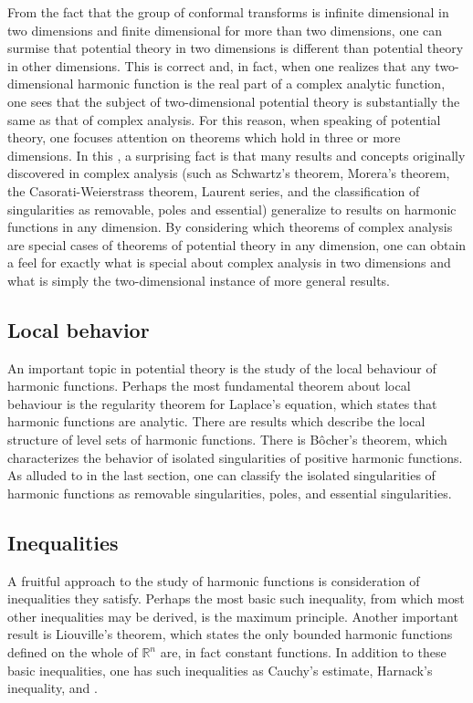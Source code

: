 \documentclass[12pt]{article}
\begin{document}
From the fact that the group of conformal transforms is infinite dimensional in two dimensions and finite dimensional for more than two dimensions, one can surmise that potential theory in two dimensions is different than potential theory in other dimensions.  This is correct and, in fact, when one realizes that any two-dimensional harmonic function is the real part of a complex analytic function, one sees that the subject of two-dimensional potential theory is substantially the same as that of complex analysis.  For this reason, when speaking of potential theory, one focuses attention on theorems which hold in three or more dimensions.  In this , a surprising fact is that many results and concepts originally discovered in complex analysis (such as Schwartz's theorem, Morera's theorem, the Casorati-Weierstrass theorem, Laurent series, and the classification of singularities as removable, poles and essential) generalize to results on harmonic functions in any dimension.  By considering which theorems of complex analysis are special cases of theorems of potential theory in any dimension, one can obtain a feel for exactly what is special about complex analysis in two dimensions and what is simply the two-dimensional instance of more general results.

\subsection{Local behavior}

An important topic in potential theory is the study of the local behaviour of harmonic functions.  Perhaps the most fundamental theorem about local behaviour is the regularity theorem for Laplace's equation, which states that harmonic functions are analytic.  There are results which describe the local structure of level sets of harmonic functions.  There is B\^ocher's theorem, which characterizes the behavior of isolated singularities of positive harmonic functions.  As alluded to in the last section, one can classify the isolated singularities of harmonic functions as removable singularities, poles, and essential singularities.

\subsection{Inequalities}

A fruitful approach to the study of harmonic functions is consideration of inequalities they satisfy.  Perhaps the most basic such inequality, from which most other inequalities may be derived, is the maximum principle.  Another important result is Liouville's theorem, which states the only bounded harmonic functions defined on the whole of $\mathbb{R}^n$ are, in fact constant functions.  In addition to these basic inequalities, one has such inequalities as Cauchy's estimate, Harnack's inequality, and .
\end{document}
